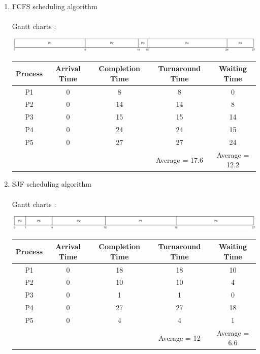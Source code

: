 \documentclass[a4paper]{article}
\begin{document}
\begin{enumerate}[label=\alph*)]
\item FCFS scheduling algorithm \\
\\
Gantt charts :
\begin{center}
\includegraphics[scale=0.9]{ex2 fcfs.png}
\end{center}
\begin{center}
\begin{tabular}{|c|c|c|c|c|}
\hline
Process & Arrival Time & Completion Time & Turnaround Time & Waiting Time \\
\hline
P1 & 0 & 8 & 8 & 0\\
\hline
P2 & 0 & 14 & 14 & 8\\
\hline
P3 & 0 & 15 & 15 & 14\\
\hline
P4 & 0 & 24 & 24 & 15\\
\hline
P5 & 0 & 27 & 27 & 24\\
\hline
&&& Average = 17.6 & Average = 12.2\\ 
\hline
\end{tabular}
\end{center}

\item SJF scheduling algorithm \\
\\
Gantt charts :
\begin{center}
\includegraphics[scale=0.9]{ex2 sjf.png}
\end{center}
\begin{center}
\begin{tabular}{|c|c|c|c|c|}
\hline
Process & Arrival Time & Completion Time & Turnaround Time & Waiting Time \\
\hline
P1 & 0 & 18 & 18 & 10\\
\hline
P2 & 0 & 10 & 10 & 4\\
\hline
P3 & 0 & 1 & 1 & 0\\
\hline
P4 & 0 & 27 & 27 & 18\\
\hline
P5 & 0 & 4 & 4 & 1\\
\hline
&&& Average = 12 & Average = 6.6\\ 
\hline
\end{tabular}
\end{center}


\end{enumerate}
\end{document}
